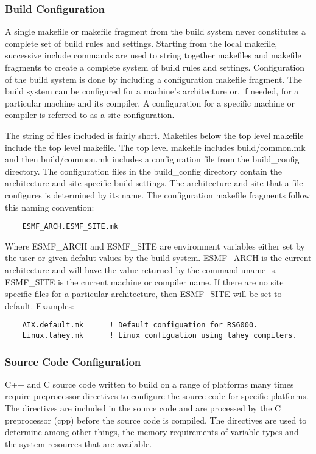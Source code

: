 \subsubsection{Build Configuration}

A single makefile or makefile fragment from the build system never
constitutes a complete set of build rules and settings.  Starting from
the local makefile, successive include commands are used to string
together makefiles and makefile fragments to create a complete system
of build rules and settings.  Configuration of the build system is
done by including a configuration makefile fragment.  The build
system can be configured for a machine's architecture or, if needed,
for a particular machine and its compiler. A configuration for a
specific machine or compiler is referred to as a site configuration.

The string of files included is fairly short.  Makefiles below the top
level makefile include the top level makefile. The top level makefile
includes build/common.mk and then build/common.mk includes a
configuration file from the build\_config directory.  The configuration
files in the build\_config directory contain the architecture and site
specific build settings.  The architecture and site that a file
configures is determined by its name.  The configuration makefile
fragments follow this naming convention:

\begin{verbatim}
    ESMF_ARCH.ESMF_SITE.mk
\end{verbatim}

Where ESMF\_ARCH and ESMF\_SITE are environment variables either set by
the user or given defalut values by the build system. ESMF\_ARCH is the
current architecture and will have the value returned by the command
uname -s.  ESMF\_SITE is the current machine or compiler name. If there
are no site specific files for a particular architecture, then
ESMF\_SITE will be set to default.  Examples:

\begin{verbatim}
    AIX.default.mk      ! Default configuation for RS6000.
    Linux.lahey.mk      ! Linux configuation using lahey compilers.
\end{verbatim}

\subsubsection{Source Code Configuration}

C++ and C source code written to build on a range of platforms many
times require preprocessor directives to configure the source code for
specific platforms.  The directives are included in the source code
and are processed by the C preprocessor (cpp) before the source code
is compiled.  The directives are used to determine among other things,
the memory requirements of variable types and the system resources
that are available.

